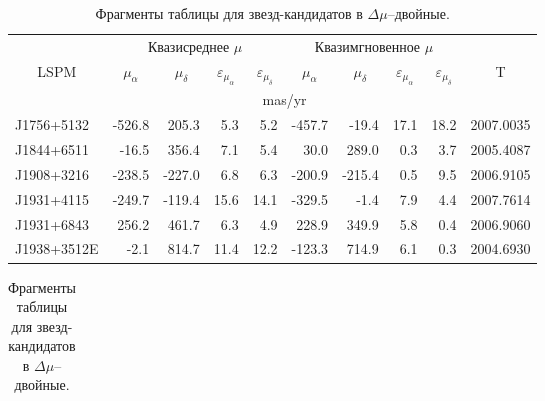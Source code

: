 \begin{table}[htbp]
\centering
\caption{Фрагменты таблицы для звезд-кандидатов в $\Delta\mu$--двойные.}
\label{tab:candidates}
\vspace{5mm}
\begin{tabularx}{\textwidth}{l|r|r|r|r|r|r|r|r|l} \hline
           & \multicolumn{4}{c|}{Квазисреднее $\mu$ } & \multicolumn{4}{c|}{Квазимгновенное $\mu$}& \\ \cline{2-9}
\multicolumn{1}{c|}{LSPM}&\multicolumn{1}{c|}{$\mu_\alpha$}&\multicolumn{1}{c|}{$\mu_\delta$}&\multicolumn{1}{c|}{$\varepsilon_{\mu_\alpha}$}&\multicolumn{1}{c|}{$\varepsilon_{\mu_\delta}$}&\multicolumn{1}{c|}{$\mu_\alpha$}&\multicolumn{1}{c|}{$\mu_\delta$}&\multicolumn{1}{c|}{$\varepsilon_{\mu_\alpha}$}&\multicolumn{1}{c|}{$\varepsilon_{\mu_\delta}$}&\multicolumn{1}{c}{T}\\ \cline{2-9}	   
	       &\multicolumn{8}{c|}{mas/yr}&\\ \hline  
J1756+5132 & -526.8&  205.3&  5.3&  5.2& -457.7&  -19.4& 17.1& 18.2& 2007.0035\\
J1844+6511 &  -16.5&  356.4&  7.1&  5.4&   30.0&  289.0&  0.3&  3.7& 2005.4087\\
J1908+3216 & -238.5& -227.0&  6.8&  6.3& -200.9& -215.4&  0.5&  9.5& 2006.9105\\
J1931+4115 & -249.7& -119.4& 15.6& 14.1& -329.5&   -1.4&  7.9&  4.4& 2007.7614\\
J1931+6843 &  256.2&  461.7&  6.3&  4.9&  228.9&  349.9&  5.8&  0.4& 2006.9060\\
J1938+3512E&   -2.1&  814.7& 11.4& 12.2& -123.3&  714.9&  6.1&  0.3& 2004.6930\\ \hline
\end{tabularx}
\begin{tabularx}{\textwidth}{l|r|c|r|r|r|r|r|r|l}


\end{tabularx}
\end{table}
